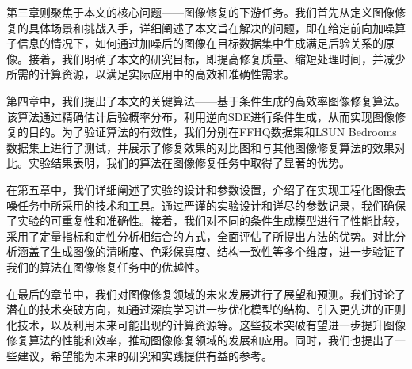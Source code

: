 第三章则聚焦于本文的核心问题——图像修复的下游任务。我们首先从定义图像修复的具体场景和挑战入手，详细阐述了本文旨在解决的问题，即在给定前向加噪算子信息的情况下，如何通过加噪后的图像在目标数据集中生成满足后验关系的原像。接着，我们明确了本文的研究目标，即提高修复质量、缩短处理时间，并减少所需的计算资源，以满足实际应用中的高效和准确性需求。

第四章中，我们提出了本文的关键算法——基于条件生成的高效率图像修复算法。该算法通过精确估计后验概率分布，利用逆向SDE进行条件生成，从而实现图像修复的目的。为了验证算法的有效性，我们分别在FFHQ数据集和LSUN Bedrooms数据集上进行了测试，并展示了修复效果的对比图和与其他图像修复算法的效果对比。实验结果表明，我们的算法在图像修复任务中取得了显著的优势。

在第五章中，我们详细阐述了实验的设计和参数设置，介绍了在实现工程化图像去噪任务中所采用的技术和工具。通过严谨的实验设计和详尽的参数记录，我们确保了实验的可重复性和准确性。接着，我们对不同的条件生成模型进行了性能比较，采用了定量指标和定性分析相结合的方式，全面评估了所提出方法的优势。对比分析涵盖了生成图像的清晰度、色彩保真度、结构一致性等多个维度，进一步验证了我们的算法在图像修复任务中的优越性。

在最后的章节中，我们对图像修复领域的未来发展进行了展望和预测。我们讨论了潜在的技术突破方向，如通过深度学习进一步优化模型的结构、引入更先进的正则化技术，以及利用未来可能出现的计算资源等。这些技术突破有望进一步提升图像修复算法的性能和效率，推动图像修复领域的发展和应用。同时，我们也提出了一些建议，希望能为未来的研究和实践提供有益的参考。

